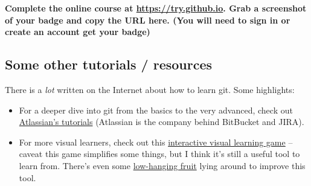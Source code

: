 \documentclass{article}
\begin{document}
\medskip
\noindent
\textbf{Complete the online course at \url{https://try.github.io}. Grab a
  screenshot of your badge and copy the URL here.
  {\small (You will need to sign in or create an account get your badge)}
}

\medskip
\noindent
{}


\subsection*{Some other tutorials / resources}

There is a \emph{lot} written on the Internet about how to learn git. Some
highlights:

\begin{itemize}
  \item For a deeper dive into git from the basics to the very advanced, check
    out \href{https://www.atlassian.com/git/tutorials}{Atlassian's tutorials}
    (Atlassian is the company behind BitBucket and JIRA).
  \item For more visual learners, check out this
    \href{http://pcottle.github.io/learnGitBranching/}{interactive visual
    learning game} -- caveat this game simplifies some things, but I think
    it's still a useful tool to learn from.  There's even some
    \href{https://github.com/pcottle/learnGitBranching/issues/201}{low-hanging
    fruit} lying around to improve this tool.
\end{itemize}
\end{document}
